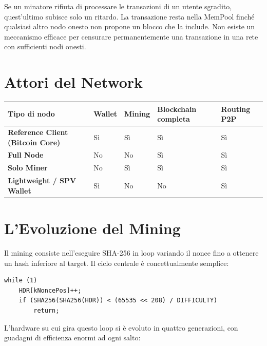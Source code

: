 \documentclass[
  italian,
  openany]{book}
\newcounter{none} %
\begin{document}
Se un minatore rifiuta di processare le transazioni di un utente
sgradito, quest'ultimo subisce solo un ritardo. La transazione resta
nella MemPool finché qualsiasi altro nodo onesto non propone un blocco
che la include. Non esiste un meccanismo efficace per censurare
permanentemente una transazione in una rete con sufficienti nodi onesti.

\section{Attori del Network}\label{attori-del-network}

{\def\LTcaptype{none} %
\begin{longtable}[]{@{}lllll@{}}
\toprule\noalign{}
Tipo di nodo & Wallet & Mining & Blockchain completa & Routing P2P \\
\midrule\noalign{}
\endhead
\bottomrule\noalign{}
\endlastfoot
\textbf{Reference Client (Bitcoin Core)} & Sì & Sì & Sì & Sì \\
\textbf{Full Node} & No & No & Sì & Sì \\
\textbf{Solo Miner} & No & Sì & Sì & Sì \\
\textbf{Lightweight / SPV Wallet} & Sì & No & No & Sì \\
\end{longtable}
}

\section{L'Evoluzione del Mining}\label{levoluzione-del-mining}

Il mining consiste nell'eseguire SHA-256 in loop variando il nonce fino
a ottenere un hash inferiore al target. Il ciclo centrale è
concettualmente semplice:

\begin{verbatim}
while (1)
    HDR[kNoncePos]++;
    if (SHA256(SHA256(HDR)) < (65535 << 208) / DIFFICULTY)
        return;
\end{verbatim}

L'hardware su cui gira questo loop si è evoluto in quattro generazioni,
con guadagni di efficienza enormi ad ogni salto:
\end{document}
